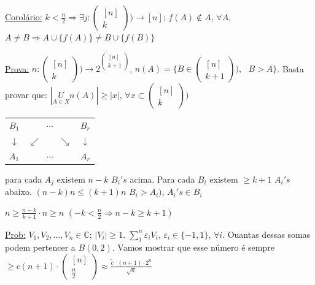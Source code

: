 \documentclass[a4paper,12pt]{article}
\renewcommand{\epsilon}{\ensuremath{\varepsilon}}
\theoremstyle{plain} %
\theoremstyle{definition} %
\theoremstyle{remark} %
\begin{document}
	\vspace{1ex}
	\underline{Corol\'ario:} $k<\frac{n}{2}\Rightarrow \exists j: \left(\begin{smallmatrix}
		[n]\\
		k
	\end{smallmatrix}\right))\rightarrow [n]$; $f(A)\not\in A$, $\forall A$, $A\neq B\Rightarrow A\cup \{f(A)\}\neq B\cup \{f(B)\}$
	
	\begin{framed}
		\underline{Prova:} $n:\left(\begin{smallmatrix}
			[n]\\
			k
		\end{smallmatrix}\right))\rightarrow 2^{\left(\begin{smallmatrix}
				[n]\\
				k+1
			\end{smallmatrix}\right)}$, $n(A)=\{B\in \left(\begin{smallmatrix}
			[n]\\
			k+1
		\end{smallmatrix}\right)),\text{ } B>A\}$. Basta provar que: $|\underset{A\in X}{U} n(A)|\geqslant|x|$, $\forall x\subset \left(\begin{smallmatrix}
			[n]\\
			k
		\end{smallmatrix}\right))$
		
		\begin{tabular}{ccccc}
			$B_1$        & \multicolumn{3}{c}{$\cdots$} & $B_r$        \\
			$\downarrow$ & $\swarrow$  &   & $\searrow$ & $\downarrow$ \\
			$A_1$        & \multicolumn{3}{c}{$\cdots$} & $A_r$       
		\end{tabular} \hspace{1em} para cada $A_j$ existem $n-k$ $B_i's$ acima. Para cada $B_i$ existem $\geqslant k+1$ $A_i's$ abaixo. $(n-k)n\leqslant(k+1)n$ $B_i>A_i)$, $A_i's\in B_i$
		
		$n\geqslant \frac{n-k}{k+1}\cdot n\geqslant n$ $(-k<\frac{n}{2}\Rightarrow n-k\geqslant k+1)$
	\end{framed}
	
	\vspace{1ex}\vspace{2ex}\underline{Prob:} $V_1, V_2,\dots,V_n\in \mathds{C}$; $|V_i|\geqslant 1$. $\sum\limits_1^n{\epsilon_i V_i}$, $\epsilon_i\in \{-1,1\}$, $\forall i$. Ouantas dessas somas podem pertencer a $B(0,2)$. Vamos mostrar que esse n\'umero \'e sempre $\geqslant c(n+1)\cdot \left(\begin{smallmatrix}
		[n]\\
		\frac{n}{2}
	\end{smallmatrix}\right)\approx \displaystyle\frac{\tilde{c} \text{ }(n+1)\cdot 2^n}{\sqrt{n}}$ 
	
\end{document}
